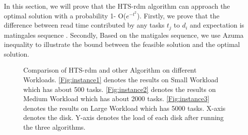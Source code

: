 \documentclass[conference]{IEEEtran}
\begin{document}
In this section, we will prove that the HTS-rdm algorithm can approach the optimal solution with a probability 1- O($e^{-t^2}$). Firstly, we prove that the difference between read time contributed by any tasks $t_j$ to $d_i$ and expectation is matingales sequence \cite{b12}. Secondly, Based on the matigales sequence, we use Azuma inequality to illustrate the bound between the feasible solution and the optimal solution.
\begin{figure}[!t]
	\centering
	\quad\quad %
	\quad\quad
	\vspace{-1ex}
	\caption{Comparison of HTS-rdm and other Algorithm on different Workloads. \ref{Fig:instance1} denotes the results on Small Workload which has about 500 tasks. \ref{Fig:instance2} denotes the results on Medium Workload which has about 2000 tasks.
	\ref{Fig:instance3} denotes the results on Large Workload which has 5000 tasks. X-axis denotes the disk. Y-axis denotes the load of each disk after running the three algorithms.}
	\label{Fig:instance}
	\vspace{-1ex}
\end{figure}
\end{document}
